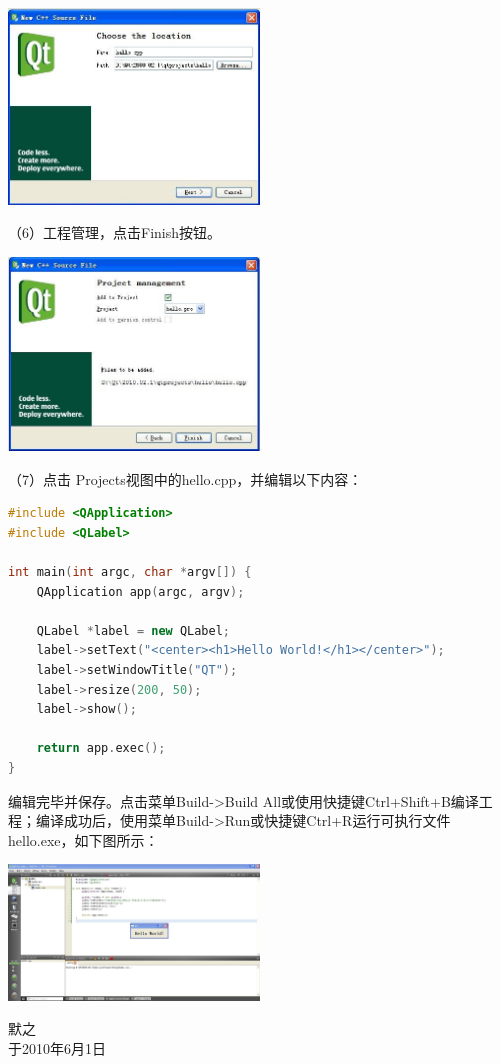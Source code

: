 \documentclass[a4paper, 12pt]{article}
\begin{document}
\begin{center}
  \setlength{\abovecaptionskip}{0pt}    
  \setlength{\belowcaptionskip}{10pt}
  \includegraphics[width=0.5\textwidth]{pics/qt05.jpg}
\end{center}

（6）工程管理，点击Finish按钮。

\begin{center}
  \setlength{\abovecaptionskip}{0pt}    
  \setlength{\belowcaptionskip}{10pt}
  \includegraphics[width=0.5\textwidth]{pics/qt06.jpg}
\end{center}

（7）点击 Projects视图中的hello.cpp，并编辑以下内容：

\begin{lstlisting}[language=C++]
#include <QApplication>
#include <QLabel>
 
int main(int argc, char *argv[]) {
    QApplication app(argc, argv);
 
    QLabel *label = new QLabel;
    label->setText("<center><h1>Hello World!</h1></center>");
    label->setWindowTitle("QT");
    label->resize(200, 50);
    label->show();
 
    return app.exec();
}
\end{lstlisting}

编辑完毕并保存。点击菜单Build->Build All或使用快捷键Ctrl+Shift+B编译工程；编译成功后，使用菜单Build->Run或快捷键Ctrl+R运行可执行文件 hello.exe，如下图所示：

\begin{center}
  \setlength{\abovecaptionskip}{0pt}    
  \setlength{\belowcaptionskip}{10pt}
  \includegraphics[width=0.5\textwidth]{pics/qt07.jpg}
\end{center}

\begin{flushright}
默之 \\于2010年6月1日
\end{flushright}
\end{document}
